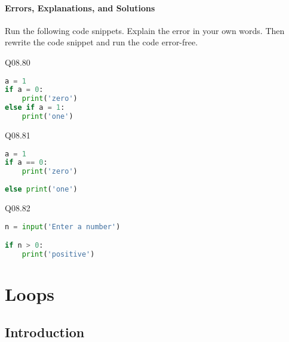 \documentclass{book}
\begin{document}
    




    
        \hypertarget{errors-explanations-and-solutions}{%
\subsubsection{Errors, Explanations, and
Solutions}\label{errors-explanations-and-solutions}}

Run the following code snippets. Explain the error in your own words.
Then rewrite the code snippet and run the code error-free.
    




    
        Q08.80

\begin{lstlisting}[language=Python]
a = 1
if a = 0:
    print('zero')
else if a = 1:
    print('one')
\end{lstlisting}
    




    
        Q08.81

\begin{lstlisting}[language=Python]
a = 1
if a == 0:
    print('zero')
    
else print('one')
\end{lstlisting}
    




    
        Q08.82

\begin{lstlisting}[language=Python]
n = input('Enter a number')

if n > 0:
    print('positive')
\end{lstlisting}
    




    
        \hypertarget{loops}{%
\chapter{Loops}\label{loops}}
    




    
        \hypertarget{introduction}{%
\section{Introduction}\label{introduction}}
    
\end{document}
